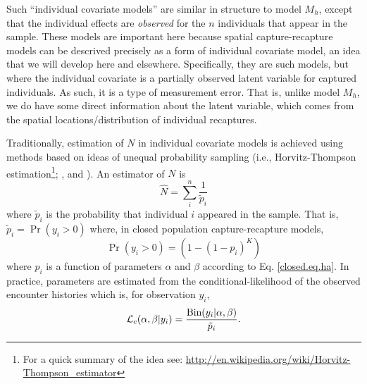 Such ``individual covariate models'' are similar in structure to model
$M_{h}$, except that the individual effects are {\it observed} for the
$n$ individuals that appear in the sample. These models are important
here because spatial capture-recapture models can be descrived precisely as a form of
individual covariate model, an idea that we will develop here and
elsewhere. Specifically, they are such models, but where the
individual covariate is a partially observed latent variable for
captured individuals. As such, it is a type of measurement error.
That is, unlike model $M_h$, we do have some direct information about the
latent variable, which comes from the spatial locations/distribution
of individual recaptures.

Traditionally, estimation of $N$ in individual covariate models is
achieved using methods based on ideas of unequal probability sampling
(i.e., Horvitz-Thompson estimation\footnote{For a  quick summary of
  the idea see:
  \url{http://en.wikipedia.org/wiki/Horvitz-Thompson_estimator}};
\citet{huggins:1989},
\citet{alho:1990} and \citet{borchers_etal:2002}). An estimator of $N$ is
\[
\hat{N} = \sum_{i}^{n} \frac{1}{\tilde{p}_{i}}
\]
where $\tilde{p}_{i}$ is the probability that individual $i$ appeared
in the sample.  That is, $\tilde{p}_{i} = \Pr(y_{i}>0)$
where, in closed population capture-recapture models,
\[
\Pr(y_{i}>0) = (1- (1-p_{i})^K)
\]
where $p_{i}$ is a function of parameters $\alpha$ and $\beta$
according to Eq. \ref{closed.eq.ha}.  In practice, parameters are
estimated from the conditional-likelihood of the observed encounter
histories which is, for observation $y_{i}$,
\[
{\cal L}_{c}(\alpha, \beta | y_{i}) = \frac{ \mbox{Bin}(y_{i}|\alpha,\beta) } { \tilde{p}_{i}}.
\]

